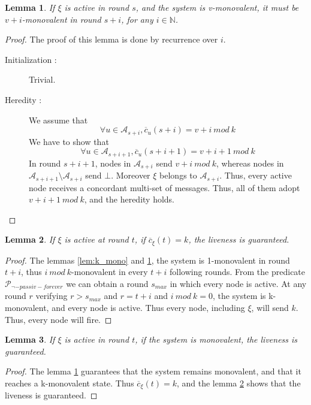 \documentclass{article}
\newtheorem{lemma}{Lemma}[section]
\begin{document}
\begin{lemma}\label{lem:mono_mono}
	If $\xi$ is active in round $s$, and the system is v-monovalent, it must be $v+i$-monovalent in round $s+i$,
	for any $i \in \mathds{N}$.
\end{lemma}
\begin{proof}
	The proof of this lemma is done by recurrence over $i$.
	\begin{description}
		\item[Initialization :] Trivial.
		\item[Heredity :] We assume that
			$$\forall u \in \mathcal{A}_{s+i}, \overline{c}_u(s+i) = v+i~mod~k$$
			We have to show that 
			$$\forall u \in \mathcal{A}_{s+i+1}, \overline{c}_u(s+i+1) = v+i+1~mod~k$$
			In round $s+i+1$, nodes in $\mathcal{A}_{s+i}$ send $v+i~mod~k$, whereas nodes 
			in $\mathcal{A}_{s+i+1} \setminus \mathcal{A}_{s+i}$ send $\bot$.
			Moreover $\xi$ belongs to $\mathcal{A}_{s+i}$.
			Thus, every active node receives a concordant multi-set of messages.
			Thus, all of them adopt $v+i+1~mod~k$, and the heredity holds.
	\end{description}
\end{proof}

\begin{lemma}\label{lem:k_liv}
	If $\xi$ is active at round $t$, if $\overline{c}_\xi(t) = k$, the liveness is guaranteed.
\end{lemma}
\begin{proof}
	The lemmas \ref{lem:k_mono} and \ref{lem:mono_mono}, the system is 1-monovalent in round $t+i$,
	thus $i~mod~k$-monovalent in every $t+i$ following rounds.
	From the predicate $\mathcal{P}_{\neg-passiv-forever}$ we can obtain a round $s_{max}$ in which every node is active.
	At any round $r$ verifying $r > s_{max}$ and $r = t + i$ and $i~mod~k = 0$, the system is k-monovalent,
	and every node is active. Thus every node, including $\xi$, will send $k$.
	Thus, every node will fire.
\end{proof}

\begin{lemma}\label{lem:mono_liv}
	If $\xi$ is active in round $t$, if the system is monovalent, the liveness is guaranteed.
\end{lemma}
\begin{proof}
	The lemma \ref{lem:mono_mono} guarantees that the system remains monovalent, and that it reaches a
	k-monovalent state.
	Thus $\overline{c}_\xi(t) = k$, and the lemma \ref{lem:k_liv} shows that the liveness is guaranteed.
\end{proof}
\end{document}
